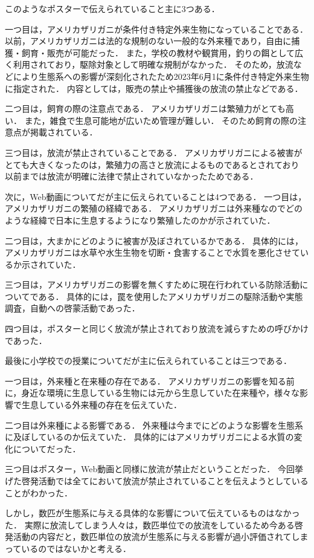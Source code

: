 \documentclass[12pt,a4j,titlepage]{ltjsarticle}
\begin{document}
このようなポスターで伝えられていること主に3つある．

一つ目は，アメリカザリガニが条件付き特定外来生物になっていることである．
以前，アメリカザリガニは法的な規制のない一般的な外来種であり，自由に捕獲・飼育・販売が可能だった．
また，学校の教材や観賞用，釣りの餌として広く利用されており，駆除対象として明確な規制がなかった．
そのため，放流などにより生態系への影響が深刻化されたため2023年6月1に条件付き特定外来生物に指定された．
内容としては，販売の禁止や捕獲後の放流の禁止などである．

二つ目は，飼育の際の注意点である．
アメリカザリガニは繁殖力がとても高い．
また，雑食で生息可能地が広いため管理が難しい．
そのため飼育の際の注意点が掲載されている．

三つ目は，放流が禁止されていることである．
アメリカザリガニによる被害がとても大きくなったのは，繁殖力の高さと放流によるものであるとされており
以前までは放流が明確に法律で禁止されていなかったためである．

次に，Web動画についてだが主に伝えられていることは4つである．
一つ目は，アメリカザリガニの繁殖の経緯である．
アメリカザリガニは外来種なのでどのような経緯で日本に生息するようになり繁殖したのかが示されていた．

二つ目は，大まかにどのように被害が及ぼされているかである．
具体的には，アメリカザリガニは水草や水生生物を切断・食害することで水質を悪化させているか示されていた．

三つ目は，アメリカザリガニの影響を無くすために現在行われている防除活動についてである．
具体的には，罠を使用したアメリカザリガニの駆除活動や実態調査，自動への啓蒙活動であった．

四つ目は，ポスターと同じく放流が禁止されており放流を減らすための呼びかけであった．

最後に小学校での授業についてだが主に伝えられていることは三つである．

一つ目は，外来種と在来種の存在である．
アメリカザリガニの影響を知る前に，身近な環境に生息している生物には元から生息していた在来種や，様々な影響で生息している外来種の存在を伝えていた．

二つ目は外来種による影響である．
外来種は今までにどのような影響を生態系に及ぼしているのか伝えていた．
具体的にはアメリカザリガニによる水質の変化についてだった．

三つ目はポスター，Web動画と同様に放流が禁止だということだった．
今回挙げた啓発活動では全てにおいて放流が禁止されていることを伝えようとしていることがわかった．

しかし，数匹が生態系に与える具体的な影響について伝えているものはなかった．
実際に放流してしまう人々は，数匹単位での放流をしているため今ある啓発活動の内容だと，数匹単位の放流が生態系に与える影響が過小評価されてしまっているのではないかと考える．
\end{document}
